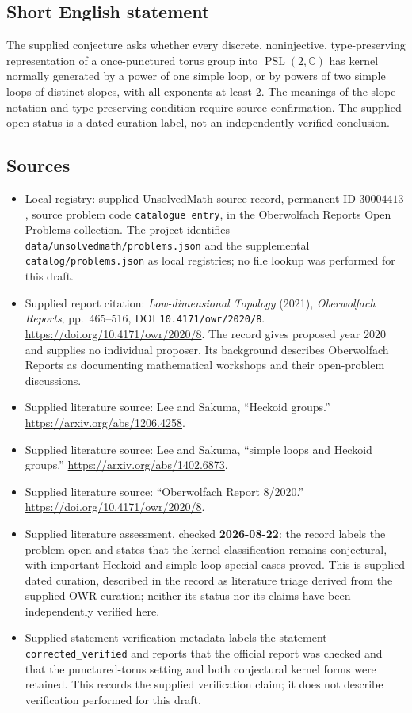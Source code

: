 \documentclass[11pt]{article}
\newcommand{\C}{\mathbb{C}}
\begin{document}
\subsection{Short English statement}
The supplied conjecture asks whether every discrete, noninjective, type-preserving representation of a once-punctured torus group into \(\operatorname{PSL}(2,\C)\) has kernel normally generated by a power of one simple loop, or by powers of two simple loops of distinct slopes, with all exponents at least \(2\). The meanings of the slope notation and type-preserving condition require source confirmation. The supplied open status is a dated curation label, not an independently verified conclusion.
\subsection{Sources}
\begin{itemize}
\item Local registry: supplied UnsolvedMath source record, permanent ID \(30004413\), source problem code \texttt{catalogue entry}, in the Oberwolfach Reports Open Problems collection. The project identifies \texttt{data/unsolvedmath/problems.json} and the supplemental \texttt{catalog/problems.json} as local registries; no file lookup was performed for this draft.
\item Supplied report citation: \emph{Low-dimensional Topology} (2021), \emph{Oberwolfach Reports}, pp.~465--516, DOI \texttt{10.4171/owr/2020/8}. \url{https://doi.org/10.4171/owr/2020/8}. The record gives proposed year 2020 and supplies no individual proposer. Its background describes Oberwolfach Reports as documenting mathematical workshops and their open-problem discussions.
\item Supplied literature source: Lee and Sakuma, ``Heckoid groups.'' \url{https://arxiv.org/abs/1206.4258}.
\item Supplied literature source: Lee and Sakuma, ``simple loops and Heckoid groups.'' \url{https://arxiv.org/abs/1402.6873}.
\item Supplied literature source: ``Oberwolfach Report 8/2020.'' \url{https://doi.org/10.4171/owr/2020/8}.
\item Supplied literature assessment, checked \textbf{2026-08-22}: the record labels the problem open and states that the kernel classification remains conjectural, with important Heckoid and simple-loop special cases proved. This is supplied dated curation, described in the record as literature triage derived from the supplied OWR curation; neither its status nor its claims have been independently verified here.
\item Supplied statement-verification metadata labels the statement \texttt{corrected\_verified} and reports that the official report was checked and that the punctured-torus setting and both conjectural kernel forms were retained. This records the supplied verification claim; it does not describe verification performed for this draft.
\end{itemize}
\end{document}
